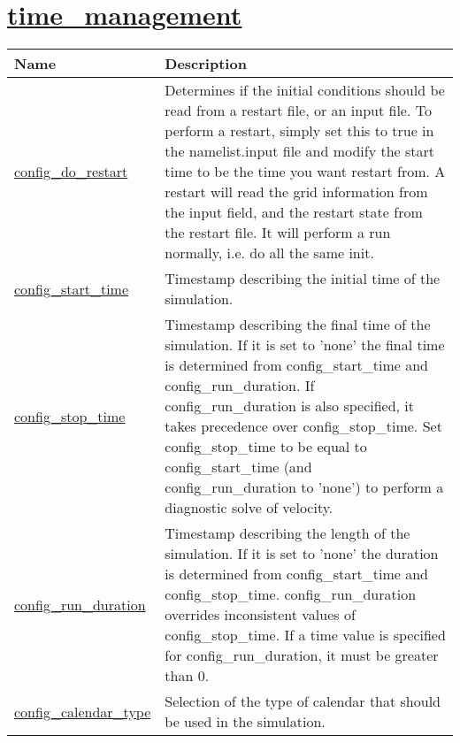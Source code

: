 \section[time\_management]{\hyperref[sec:nm_sec_time_management]{time\_management}}
\label{sec:nm_tab_time_management}

{\small
\begin{center}
\begin{longtable}{| p{2.0in} || p{4.0in} |}
	\hline
	{\bf Name} & {\bf Description} \\
	\hline
	\hline
	\hyperref[subsec:nm_sec_config_do_restart]{config\_do\_restart} & Determines if the initial conditions should be read from a restart file, or an input file.  To perform a restart, simply set this to true in the namelist.input file and modify the start time to be the time you want restart from.  A restart will read the grid information from the input field, and the restart state from the restart file.  It will perform a run normally, i.e. do all the same init. \\
	\hline
	\hyperref[subsec:nm_sec_config_start_time]{config\_start\_time} & Timestamp describing the initial time of the simulation. \\
	\hline
	\hyperref[subsec:nm_sec_config_stop_time]{config\_stop\_time} & Timestamp describing the final time of the simulation. If it is set to 'none' the final time is determined from config\_start\_time and config\_run\_duration.  If config\_run\_duration is also specified, it takes precedence over config\_stop\_time.  Set config\_stop\_time to be equal to config\_start\_time (and config\_run\_duration to 'none') to perform a diagnostic solve of velocity. \\
	\hline
	\hyperref[subsec:nm_sec_config_run_duration]{config\_run\_duration} & Timestamp describing the length of the simulation. If it is set to 'none' the duration is determined from config\_start\_time and config\_stop\_time. config\_run\_duration overrides inconsistent values of config\_stop\_time. If a time value is specified for config\_run\_duration, it must be greater than 0. \\
	\hline
	\hyperref[subsec:nm_sec_config_calendar_type]{config\_calendar\_type} & Selection of the type of calendar that should be used in the simulation. \\
	\hline
\end{longtable}
\end{center}
}
